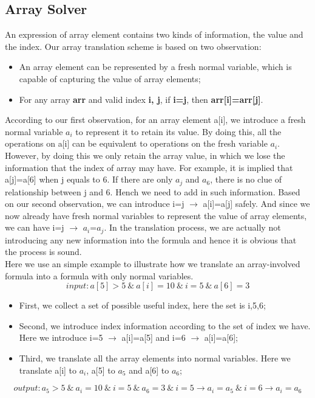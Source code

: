 \documentclass[]{article}
\begin{document}
\subsection{Array Solver}
An expression of array element contains two kinds of information, the value and the index.
Our array translation scheme is based on two observation:
\begin{itemize}
\item An array element can be represented by a fresh normal variable, which is capable of capturing the value of array elements;
\item For any array \textbf{arr} and valid index \textbf{i, j}, if \textbf{i=j}, then \textbf{arr[i]=arr[j]}.
\end{itemize}

According to our first observation, for an array element a[i], we introduce a fresh normal variable $a_i$ to represent it to retain its value. By doing this, all the operations on a[i] can be equivalent to operations on the fresh variable $a_i$. However, by doing this we only retain the array value, in which we lose the information that the index of array may have. For example, it is implied that a[j]=a[6] when j equals to 6. If there are only $a_j$ and $a_6$, there is no clue of relationship between j and 6. Hench we need to add in such information. Based on our second observation, we can introduce i=j $\rightarrow$ a[i]=a[j] safely. And since we now already have fresh normal variables to represent the value of array elements, we can have i=j $\rightarrow$ $a_i$=$a_j$. In the translation process, we are actually not introducing any new information into the formula and hence it is obvious that the process is sound.\\

Here we use an simple example to illustrate how we translate an array-involved formula into a formula with only normal variables.
\[input: a[5]>5 \: \& \: a[i]=10 \: \& \: i=5 \: \&\: a[6]=3 \]

\begin{itemize}
\item First, we collect a set of possible useful index, here the set is {i,5,6};
\item Second, we introduce index information according to the set of index we have. Here we introduce i=5 $\rightarrow$ a[i]=a[5] and i=6 $\rightarrow$ a[i]=a[6];
\item Third, we translate all the array elements into normal variables. Here we translate a[i] to $a_i$, a[5] to $a_5$ and a[6] to $a_6$;
\end{itemize}
\[output: a_5>5 \: \& \: a_i=10\: \& \: i=5 \:\&\: a_6=3 
\: \& \:  i=5 \rightarrow a_i=a_5 \: \& \:  i=6 \rightarrow a_i = a_6 \]
\end{document}

